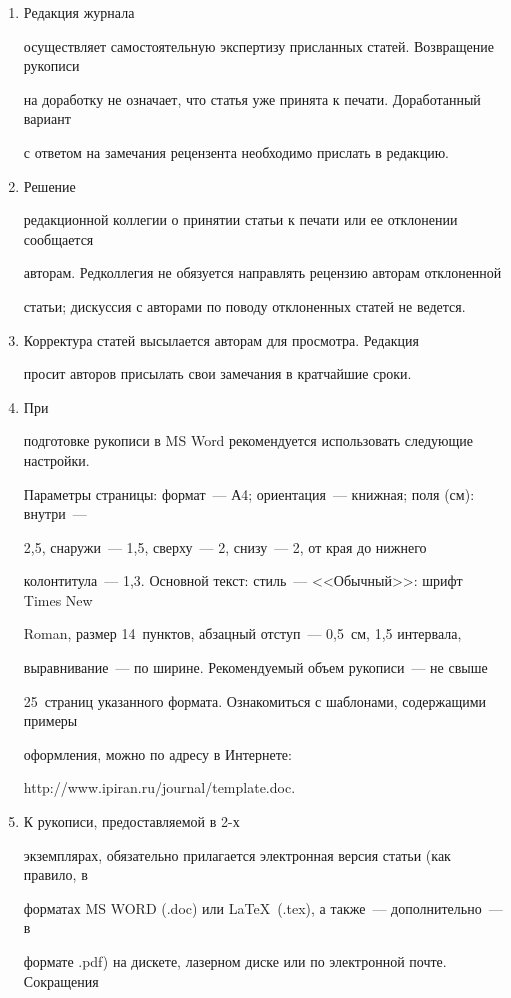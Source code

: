 {{\begin{enumerate}
\item Редакция журнала


осуществляет самостоятельную экспертизу присланных статей. Возвращение рукописи


на доработку не означает, что статья уже принята к печати. Доработанный вариант


с ответом на замечания рецензента необходимо прислать в редакцию.


\item Решение


редакционной коллегии о принятии статьи к печати или ее отклонении сообщается


авторам. Редколлегия не обязуется направлять рецензию авторам отклоненной


статьи; дискуссия с авторами по поводу отклоненных статей не ведется.


\item Корректура статей высылается авторам для просмотра. Редакция


просит авторов присылать свои замечания в кратчайшие сроки.


\item При


подготовке рукописи в MS Word рекомендуется использовать следующие настройки.


Параметры страницы: формат~--- А4; ориентация~--- книжная; поля (см): внутри~---


2,5, снаружи~--- 1,5, сверху~--- 2, снизу~--- 2, от края до нижнего


колонтитула~--- 1,3. Основной текст: стиль~--- <<Обычный>>: шрифт Times New


Roman, размер 14~пунктов, абзацный отступ~--- 0,5~см, 1,5 интервала,


выравнивание~--- по ширине. Рекомендуемый объем рукописи~--- не свыше


25~страниц указанного формата. Ознакомиться с шаблонами, содержащими примеры


оформления, можно по адресу в Интернете:


\textsf{http://www.ipiran.ru/journal/template.doc}.


\item К рукописи, предоставляемой в 2-х


экземплярах, обязательно прилагается электронная версия статьи (как правило, в


форматах MS WORD (.doc) или \LaTeX\  (.tex), а также~--- дополнительно~--- в


формате .pdf) на дискете, лазерном диске или по электронной почте. Сокращения



\end{enumerate}}}
